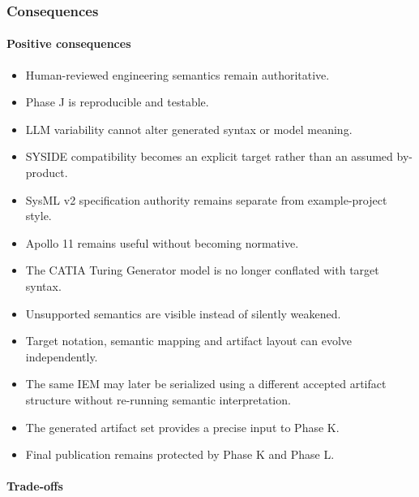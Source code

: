 \hypertarget{consequences-6}{%
\subsubsection{Consequences}\label{consequences-6}}

\hypertarget{positive-consequences-5}{%
\paragraph{Positive consequences}\label{positive-consequences-5}}

\begin{itemize}
\tightlist
\item
  Human-reviewed engineering semantics remain authoritative.
\item
  Phase J is reproducible and testable.
\item
  LLM variability cannot alter generated syntax or model meaning.
\item
  SYSIDE compatibility becomes an explicit target rather than an assumed by-product.
\item
  SysML v2 specification authority remains separate from example-project style.
\item
  Apollo 11 remains useful without becoming normative.
\item
  The CATIA Turing Generator model is no longer conflated with target syntax.
\item
  Unsupported semantics are visible instead of silently weakened.
\item
  Target notation, semantic mapping and artifact layout can evolve independently.
\item
  The same IEM may later be serialized using a different accepted artifact structure without re-running semantic interpretation.
\item
  The generated artifact set provides a precise input to Phase K.
\item
  Final publication remains protected by Phase K and Phase L.
\end{itemize}

\hypertarget{trade-offs-3}{%
\paragraph{Trade-offs}\label{trade-offs-3}}

